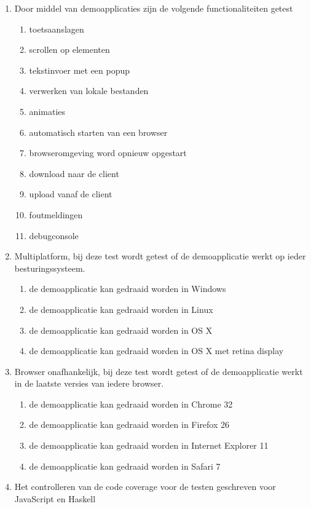 \begin{enumerate}[label={T\arabic*}]
	\setcounter{enumi}{\value{startvaluetest}}
	\item \label{test:blackbox:demo} Door middel van demoapplicaties zijn de volgende functionaliteiten getest
    \begin{enumerate}[label={T\arabic{enumi}.\arabic*}]
		\item \label{test:blackbox:keyevents} toetsaanslagen
		\item \label{test:blackbox:scrollevents} scrollen op elementen
		\item \label{test:blackbox:prompt} tekstinvoer met een popup
		\item \label{test:blackbox:lokalebestanden} verwerken van lokale bestanden
		\item \label{test:blackbox:animatie} animaties
		\item \label{test:blackbox:browser} automatisch starten van een browser
		\item \label{test:blackbox:automatischherstartenserver} browseromgeving word opnieuw opgestart
		\item \label{test:blackbox:download} download naar de client
		\item \label{test:blackbox:upload} upload vanaf de client
		\item \label{test:blackbox:error} foutmeldingen
		\item \label{test:blackbox:debug} debugconsole
	\end{enumerate}
	\item \label{test:blackbox:multiplatform} Multiplatform, bij deze test wordt getest of de demoapplicatie werkt op ieder besturingssysteem.
    \begin{enumerate}[label={T\arabic{enumi}.\arabic*}]
    	\item de demoapplicatie kan gedraaid worden in Windows
    	\item de demoapplicatie kan gedraaid worden in Linux
    	\item de demoapplicatie kan gedraaid worden in OS X
    	\item de demoapplicatie kan gedraaid worden in OS X met retina display
    \end{enumerate}
	\item \label{test:blackbox:browser} Browser onafhankelijk, bij deze test wordt getest of de demoapplicatie werkt in de laatste versies van iedere browser.
    \begin{enumerate}[label={T\arabic{enumi}.\arabic*}]
    	\item de demoapplicatie kan gedraaid worden in Chrome 32
    	\item de demoapplicatie kan gedraaid worden in Firefox 26
    	\item de demoapplicatie kan gedraaid worden in Internet Explorer 11
    	\item de demoapplicatie kan gedraaid worden in Safari 7
    \end{enumerate}
	\item \label{test:blackbox:coverage} Het controlleren van de code coverage voor de testen geschreven voor JavaScript en Haskell
	\setcounter{startvaluetest}{\value{enumi}}
\end{enumerate}

